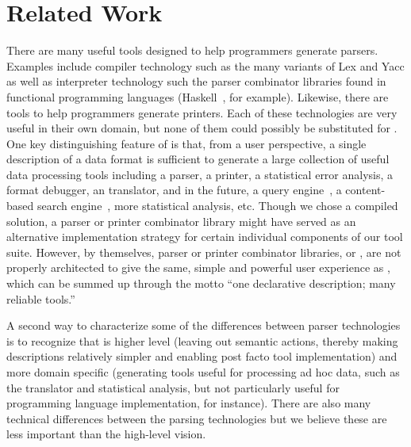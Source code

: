\section{Related Work}
\label{sec:related}

There are many useful tools designed to help programmers generate
parsers.  Examples include compiler technology such as the many
variants of Lex and Yacc as well as interpreter technology such the
parser combinator libraries
found in functional programming languages 
(Haskell~\cite{hutton+:parser-combinators}, for example).
Likewise, there are tools to help programmers generate printers.  Each of
these technologies are very useful in their own domain, but none of
them could possibly be substituted for \padsml{}.  One key
distinguishing feature of \padsml{} is that, from a user perspective,
a single description of a data format is sufficient to generate a
large collection of useful data processing tools including a parser, a
printer, a statistical error analysis, a format debugger, an \xml{}
translator, and in the future, a query engine~\cite{fernandez+:padx},
a content-based search engine~\cite{lv+:cbs,oh:siw}, more statistical analysis, etc.
Though we chose a compiled solution, a parser or printer combinator
library might have served as an alternative implementation strategy
for certain individual components of our tool suite.  However, by
themselves, parser or printer combinator libraries, \lex{} or \yacc, are
not properly architected to give the same, simple and powerful user
experience as \padsml{}, which can be summed up through the motto
``one declarative description; many reliable tools.''  

A second way to characterize some of the differences between parser
technologies is to recognize that \padsml{} is higher level (leaving
out semantic actions, thereby making descriptions relatively simpler
and enabling post facto tool implementation) and more domain specific
(generating tools useful for processing ad hoc data, such as the
\xml{} translator and statistical analysis, but not particularly
useful for programming language implementation, for instance).  There
are also many technical differences between the parsing technologies
but we believe these are less important than the high-level vision.


